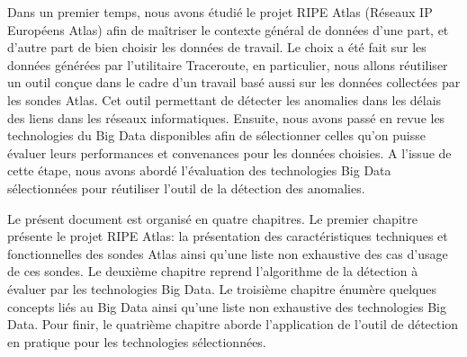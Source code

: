 
Dans un premier temps, nous avons étudié le projet RIPE  Atlas (Réseaux IP Européens Atlas) afin de maîtriser le contexte général de données  d'une part, et d'autre part de bien choisir les données de travail. Le choix a été fait sur les données générées par l'utilitaire Traceroute, en particulier, nous allons réutiliser un outil conçue dans le cadre d'un travail basé aussi sur les données collectées par les sondes Atlas. Cet outil permettant de détecter les anomalies dans les délais des liens dans les réseaux informatiques. Ensuite, nous avons passé en revue les technologies du Big Data disponibles afin de sélectionner celles qu'on puisse  évaluer leurs performances et convenances pour les données choisies. A l'issue de cette étape, nous avons abordé l'évaluation des technologies Big Data sélectionnées  pour réutiliser l'outil de la détection des anomalies.



Le présent document est organisé en quatre chapitres. Le premier chapitre présente le projet RIPE Atlas: la présentation des caractéristiques techniques et fonctionnelles des sondes Atlas ainsi qu'une liste non exhaustive des cas d'usage de ces sondes. Le deuxième chapitre reprend l'algorithme de la détection à évaluer par les technologies Big Data.
Le troisième chapitre énumère quelques concepts liés au Big Data ainsi qu'une liste non exhaustive des technologies Big Data. Pour finir, le quatrième chapitre aborde l'application de l'outil de détection en pratique pour les technologies sélectionnées.



